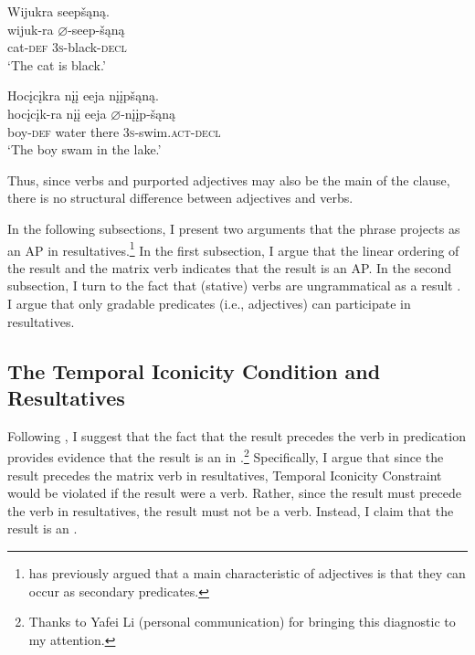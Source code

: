 \documentclass[output=paper]{LSP/langsci}
\begin{document}
\begin{exe}
\ex\label{ex:rosen:31}
\begin{xlist}

\ex \glll Wijukra seepšąną. \\
wijuk-ra {$\varnothing$}-seep-šąną\\
cat-\textsc{def} \textsc{3s}-black-\textsc{decl}\\
\glt `The cat is black.'


\ex \glll Hocįcįkra nįį eeja nįįpšąną.\\
hocįcįk-ra nįį eeja {$\varnothing$}-nįįp-šąną\\
boy-\textsc{def} water there \textsc{3s}-swim.\textsc{act}-\textsc{decl}\\
\glt `The boy swam in the lake.'

\end{xlist}
\end{exe}


Thus, since verbs and purported adjectives may also be the main  of the clause, there is no structural difference between adjectives and verbs.

In the following subsections, I present two arguments that the  phrase projects as an AP in  resultatives.\footnote{\citet{Baker2003} has previously argued that a main characteristic of adjectives is that they can occur as secondary  predicates.} In the first subsection, I argue that the linear ordering of the result and the matrix verb indicates that the result is an AP. In the second subsection, I turn to the fact that (stative) verbs are ungrammatical as a result . I argue that only gradable predicates (i.e., adjectives) can participate in resultatives. 

\subsection{The Temporal Iconicity Condition and Resultatives}

Following \citet{Li1993}, I suggest that the fact that the result precedes the verb in  predication provides evidence that the result is an  in .\footnote{Thanks to Yafei Li (personal communication) for bringing this diagnostic to my attention.} Specifically, I argue that since the result precedes the matrix verb in resultatives,  Temporal Iconicity Constraint would be violated if the result were a verb. Rather, since the result must precede the verb in  resultatives, the result must not be a verb. Instead, I claim that the result is an .
\end{document}
